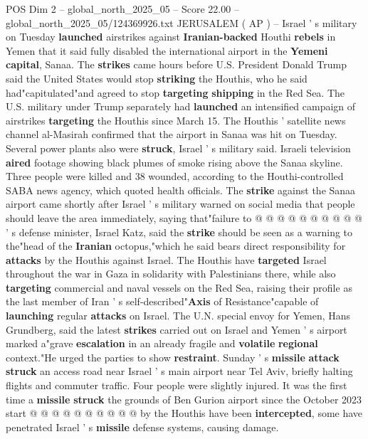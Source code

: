 \begin{textsample}{POS Dim 2 – global\_north\_2025\_05 – Score 22.00 – global\_north\_2025\_05/124369926.txt}  \label{ex:f2_pos_402}
JERUSALEM ( AP ) -- Israel ' s military on Tuesday \textbf{launched} airstrikes against \textbf{Iranian-backed} Houthi \textbf{rebels} in Yemen that it said fully disabled the international airport in the \textbf{Yemeni} \textbf{capital}, Sanaa.
The \textbf{strikes} came hours before U.S.
President Donald Trump said the United States would stop \textbf{striking} the Houthis, who he said had"capitulated"and agreed to stop \textbf{targeting} \textbf{shipping} in the Red Sea.
The U.S. military under Trump separately had \textbf{launched} an intensified campaign of airstrikes \textbf{targeting} the Houthis since March 15.
The Houthis ' satellite news channel al-Masirah confirmed that the airport in Sanaa was hit on Tuesday.
Several power plants also were \textbf{struck}, Israel ' s military said.
Israeli television \textbf{aired} footage showing black plumes of smoke rising above the Sanaa skyline.
Three people were killed and 38 wounded, according to the Houthi-controlled SABA news agency, which quoted health officials.
The \textbf{strike} against the Sanaa airport came shortly after Israel ' s military warned on social media that people should leave the area immediately, saying that"failure to @ @ @ @ @ @ @ @ @ @ ' s defense minister, Israel Katz, said the \textbf{strike} should be seen as a warning to the"head of the \textbf{Iranian} octopus,"which he said bears direct responsibility for \textbf{attacks} by the Houthis against Israel.
The Houthis have \textbf{targeted} Israel throughout the war in Gaza in solidarity with Palestinians there, while also \textbf{targeting} commercial and naval vessels on the Red Sea, raising their profile as the last member of Iran ' s self-described"\textbf{Axis} of Resistance"capable of \textbf{launching} regular \textbf{attacks} on Israel.
The U.N. special envoy for Yemen, Hans Grundberg, said the latest \textbf{strikes} carried out on Israel and Yemen ' s airport marked a"grave \textbf{escalation} in an already fragile and \textbf{volatile} \textbf{regional} context."He urged the parties to show \textbf{restraint}.
Sunday ' s \textbf{missile} \textbf{attack} \textbf{struck} an access road near Israel ' s main airport near Tel Aviv, briefly halting flights and commuter traffic.
Four people were slightly injured.
It was the first time a \textbf{missile} \textbf{struck} the grounds of Ben Gurion airport since the October 2023 start @ @ @ @ @ @ @ @ @ @ by the Houthis have been \textbf{intercepted}, some have penetrated Israel ' s \textbf{missile} defense systems, causing damage.

\end{textsample}
